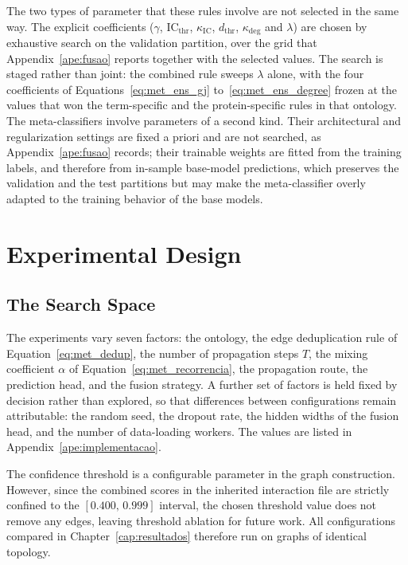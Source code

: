 \documentclass[Ingles]{ic-tese-v3}
\begin{document}
The two types of parameter that these rules involve are not selected in the same way. The explicit
coefficients ($\gamma$, $\mathrm{IC}_{\text{thr}}$, $\kappa_{\mathrm{IC}}$, $d_{\text{thr}}$,
$\kappa_{\deg}$ and $\lambda$) are chosen by exhaustive search on the validation partition, over
the grid that Appendix~\ref{ape:fusao} reports together with the selected values. The search is
staged rather than joint: the combined rule sweeps $\lambda$ alone, with the four coefficients of
Equations~\eqref{eq:met_ens_gj} to~\eqref{eq:met_ens_degree} frozen at the values that won the
term-specific and the protein-specific rules in that ontology. The meta-classifiers involve
parameters of a second kind. Their architectural and regularization settings are fixed a priori and
are not searched, as Appendix~\ref{ape:fusao} records; their trainable weights are fitted from the
training labels, and therefore from in-sample base-model predictions, which preserves the validation
and the test partitions but may make the meta-classifier overly adapted to the training behavior of
the base models.



\section{Experimental Design}
\label{sec:met_design}

\subsection{The Search Space}
\label{sec:met_espaco}

The experiments vary seven factors: the ontology, the edge deduplication rule of
Equation~\eqref{eq:met_dedup}, the number of propagation steps $T$, the mixing coefficient $\alpha$
of Equation~\eqref{eq:met_recorrencia}, the propagation route, the prediction head, and the fusion
strategy. A further set of factors is held fixed by decision rather than explored, so that
differences between configurations remain attributable: the random seed, the dropout rate, the
hidden widths of the fusion head, and the number of data-loading workers. The values are listed in
Appendix~\ref{ape:implementacao}.

The confidence threshold is a configurable parameter in the graph construction. However, since the
combined scores in the inherited interaction file are strictly confined to the $[0.400,\, 0.999]$
interval, the chosen threshold value does not remove any edges, leaving threshold ablation for future work. All
configurations compared in Chapter~\ref{cap:resultados} therefore run on graphs of identical
topology.
\end{document}
